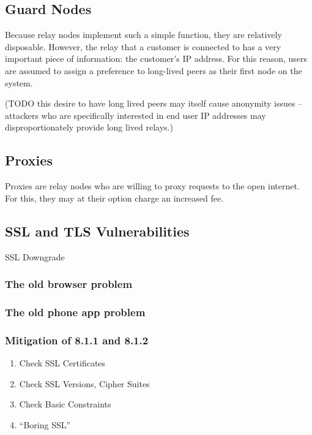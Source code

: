 \documentclass{article}
\begin{document}
\subsection{Guard Nodes}

Because relay nodes implement such a simple function, they are relatively disposable. However, the relay that a customer is connected to has a very important piece of information: the customer’s IP address. For this reason, users are assumed to assign a preference to long-lived peers as their first node on the system.

(TODO this desire to have long lived peers may itself cause anonymity issues – attackers who are specifically interested in end user IP addresses may disproportionately provide long lived relays.)

\subsection{Proxies}

Proxies are relay nodes who are willing to proxy requests to the open internet. For this, they may at their option charge an increased fee.

\subsection{SSL and TLS Vulnerabilities}

SSL Downgrade

\subsubsection{The old browser problem}

\subsubsection{The old phone app problem}

\subsubsection{Mitigation of 8.1.1 and 8.1.2}

\begin{enumerate}
    \item Check SSL Certificates
    \item Check SSL Versions, Cipher Suites
    \item Check Basic Constraints
    \item “Boring SSL”
\end{enumerate}
\end{document}
